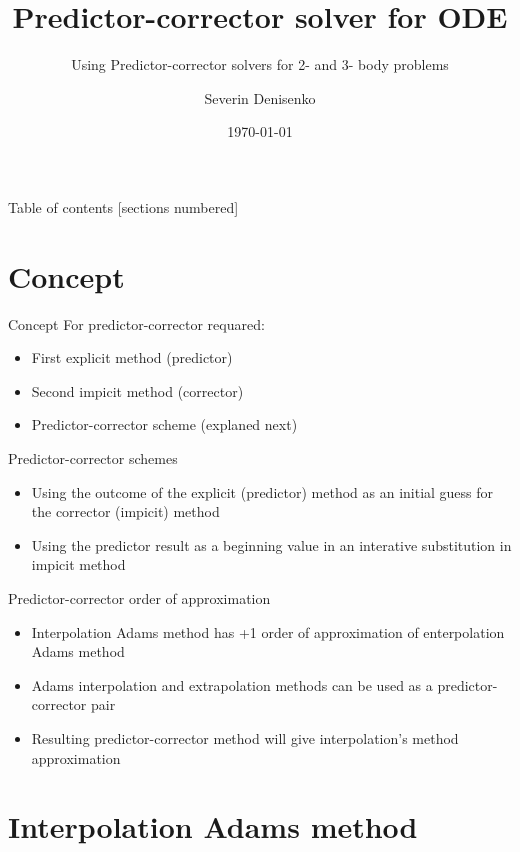 \documentclass[10pt]{beamer}
\title{Predictor-corrector solver for ODE}
\subtitle{Using Predictor-corrector solvers for 2- and 3- body problems}
\date{\today}
\author{Severin Denisenko}
\institute{Saint Petersburg State University}
\begin{document}
\maketitle

\begin{frame}{Table of contents}
  [sections numbered]
  \tableofcontents%
\end{frame}

\section[Concept]{Concept}

\begin{frame}{Concept}
    For predictor-corrector requared:
	\begin{itemize}
		\item First explicit method (predictor)
		\item Second impicit method (corrector)
		\item Predictor-corrector scheme (explaned next)
	\end{itemize}
\end{frame}

\begin{frame}{Predictor-corrector schemes}
    \begin{itemize}
        \item Using the outcome of the explicit (predictor) method as an initial guess for the corrector (impicit) method
        \item Using the predictor result as a beginning value in an interative substitution in impicit method
    \end{itemize}
\end{frame}

\begin{frame}{Predictor-corrector order of approximation}
    \begin{itemize}
        \item Interpolation Adams method has +1 order of approximation of enterpolation Adams method
        \item Adams interpolation and extrapolation methods can be used as a predictor-corrector pair
        \item Resulting predictor-corrector method will give interpolation's method approximation
    \end{itemize}
\end{frame}

\section{Interpolation Adams method}
\end{document}
